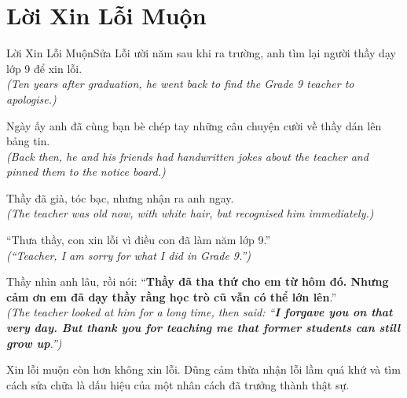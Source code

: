 \section{Lời Xin Lỗi Muộn}
\begin{truyen}{Lời Xin Lỗi Muộn}{Sửa Lỗi}
ười năm sau khi ra trường, anh tìm lại người thầy dạy lớp 9 để xin lỗi.\\
\textit{(Ten years after graduation, he went back to find the Grade 9 teacher to apologise.)}

Ngày ấy anh đã cùng bạn bè chép tay những câu chuyện cười về thầy dán lên bảng tin.\\
\textit{(Back then, he and his friends had handwritten jokes about the teacher and pinned them to the notice board.)}

Thầy đã già, tóc bạc, nhưng nhận ra anh ngay.\\
\textit{(The teacher was old now, with white hair, but recognised him immediately.)}

``Thưa thầy, con xin lỗi vì điều con đã làm năm lớp 9.''\\
\textit{(``Teacher, I am sorry for what I did in Grade 9.'')}

Thầy nhìn anh lâu, rồi nói: ``\textbf{Thầy đã tha thứ cho em từ hôm đó. Nhưng cảm ơn em đã dạy thầy rằng học trò cũ vẫn có thể lớn lên}.''\\
\textit{(The teacher looked at him for a long time, then said: ``\textbf{I forgave you on that very day. But thank you for teaching me that former students can still grow up}.'')}
\end{truyen}
\begin{baihoc}
  Xin lỗi muộn còn hơn không xin lỗi. Dũng cảm thừa nhận lỗi lầm quá khứ và tìm cách sửa chữa là dấu hiệu của một nhân cách đã trưởng thành thật sự.
\end{baihoc}
